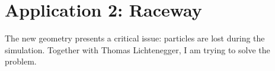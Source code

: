 
\section{Application 2: Raceway}
\label{sec:application2raceway}

The new geometry presents a critical issue: particles are lost during the
simulation. Together with Thomas Lichtenegger, I am trying to solve the problem.


